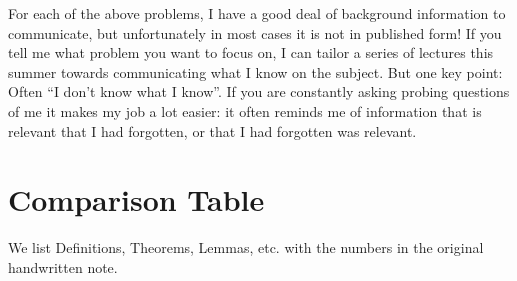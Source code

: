 \documentclass[
]{book}
\theoremstyle{definition}
\theoremstyle{definition}
\theoremstyle{definition}
\theoremstyle{definition}
\theoremstyle{remark}
\begin{document}
For each of the above problems, I have a good deal of background information to communicate, but unfortunately in most cases it is not in published form! If you tell me what problem you want to focus on, I can tailor a series of lectures this summer towards communicating what I know on the subject. But one key point: Often ``I don't know what I know''. If you are constantly asking probing questions of me it makes my job a lot easier: it often reminds me of information that is relevant that I had forgotten, or that I had forgotten was relevant.

\hypertarget{table}{%
\chapter{Comparison Table}\label{table}}

We list Definitions, Theorems, Lemmas, etc. with the numbers in the original handwritten note.
\end{document}
